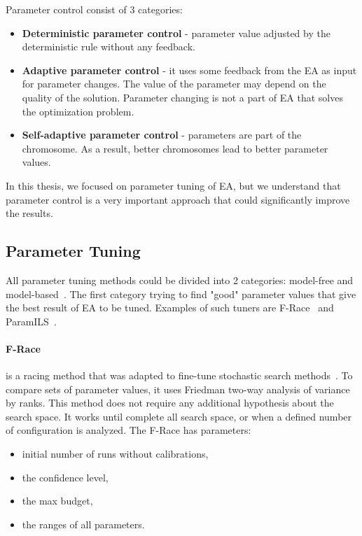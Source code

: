 Parameter control consist of 3 categories:
\begin{itemize}
	\item \textbf{Deterministic parameter control} - parameter value adjusted by the deterministic rule without any feedback. 
	\item \textbf{Adaptive parameter control} - it uses some feedback from the EA as input for parameter changes. The value of the parameter may depend on the quality of the solution. Parameter changing is not a part of EA that solves the optimization problem.
	\item \textbf{Self-adaptive parameter control} - parameters are part of the chromosome. As a result, better chromosomes lead to better parameter values.
\end{itemize}
In this thesis, we focused on parameter tuning of EA, but we understand that parameter control is a very important approach that could significantly improve the results.

\subsection{Parameter Tuning}\label{sec:parameterTuning}
All parameter tuning methods could be divided into 2 categories: model-free and model-based~\cite{hutter2010}.
The first category trying to find "good" parameter values that give the best result of EA to be tuned. Examples of such tuners are F-Race~\cite{birattari2010f} and ParamILS~\cite{hutter2009paramils}.

\paragraph{F-Race} is a racing method that was adapted to fine-tune stochastic search methods~\cite{montero2012state}. To compare sets of parameter values, it uses Friedman two-way analysis\cite{theodorsson87} of variance by ranks. This method does not require any additional hypothesis about the search space. It works until complete all search space, or when a defined number of configuration is analyzed. The F-Race has parameters:
\begin{itemize}
	\item initial number of runs without calibrations,
	\item the confidence level,
	\item the max budget,
	\item the ranges of all parameters.
\end{itemize}

